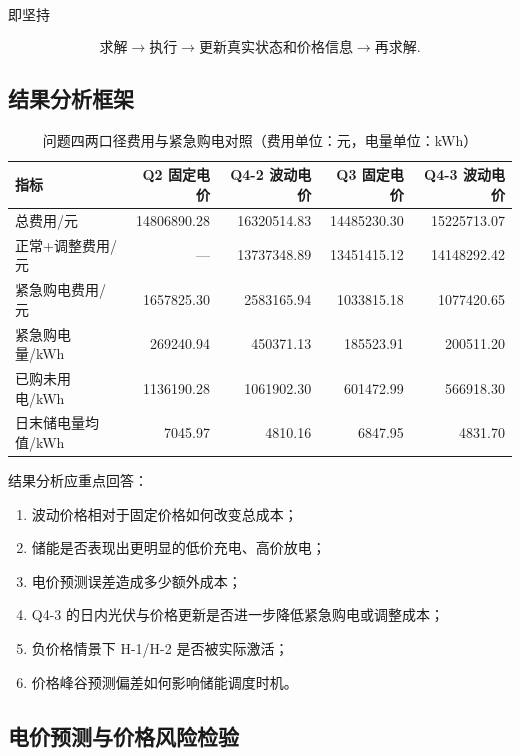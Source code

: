 即坚持

\[
\boxed{
\text{求解}
\rightarrow
\text{执行}
\rightarrow
\text{更新真实状态和价格信息}
\rightarrow
\text{再求解}
}.
\]

\subsection{结果分析框架}



\begin{table}[H]
\centering
{}
\begin{tabular}{lrrrr}
\toprule
指标 & Q2 固定电价 & Q4-2 波动电价 & Q3 固定电价 & Q4-3 波动电价 \\
\midrule
总费用/元 & 14806890.28 & 16320514.83 & 14485230.30 & 15225713.07 \\
正常+调整费用/元 & — & 13737348.89 & 13451415.12 & 14148292.42 \\
紧急购电费用/元 & 1657825.30 & 2583165.94 & 1033815.18 & 1077420.65 \\
紧急购电量/kWh & 269240.94 & 450371.13 & 185523.91 & 200511.20 \\
已购未用电/kWh & 1136190.28 & 1061902.30 & 601472.99 & 566918.30 \\
日末储电量均值/kWh & 7045.97 & 4810.16 & 6847.95 & 4831.70 \\
\bottomrule
\end{tabular}
\caption{问题四两口径费用与紧急购电对照（费用单位：元，电量单位：kWh）}
\label{tab:11}
\end{table}

结果分析应重点回答：

\begin{enumerate}
\item 波动价格相对于固定价格如何改变总成本；
\item 储能是否表现出更明显的低价充电、高价放电；
\item 电价预测误差造成多少额外成本；
\item Q4-3 的日内光伏与价格更新是否进一步降低紧急购电或调整成本；
\item 负价格情景下 H-1/H-2 是否被实际激活；
\item 价格峰谷预测偏差如何影响储能调度时机。
\end{enumerate}

\subsection{电价预测与价格风险检验}

